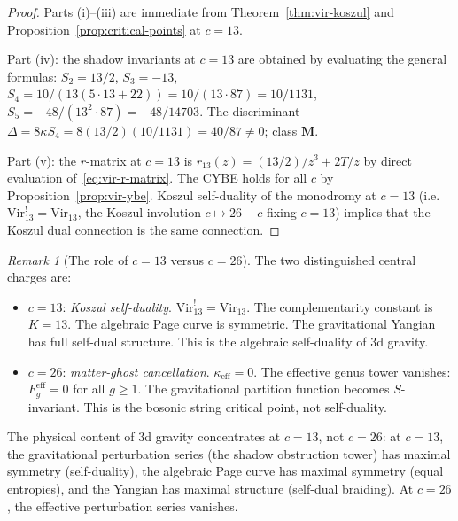 \documentclass[11pt,reqno]{amsart}
\theoremstyle{definition}
\theoremstyle{remark}
\newtheorem{remark}[theorem]{Remark}
\begin{document}
\begin{proof}
Parts (i)--(iii) are immediate from Theorem~\ref{thm:vir-koszul}
and Proposition~\ref{prop:critical-points} at $c = 13$.

Part (iv): the shadow invariants at $c = 13$ are obtained by
evaluating the general formulas: $S_2 = 13/2$,
$S_3 = -13$, $S_4 = 10/(13(5 \cdot 13 + 22))
= 10/(13 \cdot 87) = 10/1131$,
$S_5 = -48/(13^2 \cdot 87) = -48/14703$.
The discriminant $\Delta = 8\kappa S_4
= 8(13/2)(10/1131) = 40/87 \ne 0$; class $\mathbf{M}$.

Part (v): the $r$-matrix at $c = 13$ is
$r_{13}(z) = (13/2)/z^3 + 2T/z$ by direct evaluation
of~\eqref{eq:vir-r-matrix}. The CYBE holds for all $c$ by
Proposition~\ref{prop:vir-ybe}. Koszul self-duality of the
monodromy at $c = 13$ (i.e.\ $\mathrm{Vir}_{13}^!
= \mathrm{Vir}_{13}$, the Koszul involution $c \mapsto 26 - c$
fixing $c = 13$) implies that the Koszul dual connection is the
same connection.
\end{proof}

\begin{remark}[The role of $c = 13$ versus $c = 26$]
\label{rem:c13-vs-c26}
The two distinguished central charges are:
\begin{itemize}
\item $c = 13$: \emph{Koszul self-duality}.
  $\mathrm{Vir}_{13}^! = \mathrm{Vir}_{13}$. The
  complementarity constant is $K = 13$. The algebraic Page curve
  is symmetric. The gravitational Yangian has full self-dual structure.
  This is the algebraic self-duality of $3$d gravity.
\item $c = 26$: \emph{matter-ghost cancellation}.
  $\kappa_{\mathrm{eff}} = 0$. The effective genus tower vanishes:
  $F_g^{\mathrm{eff}} = 0$ for all $g \ge 1$. The gravitational
  partition function becomes $S$-invariant. This is the bosonic
  string critical point, not self-duality.
\end{itemize}
The physical content of $3$d gravity concentrates at $c = 13$, not
$c = 26$: at $c = 13$, the gravitational perturbation series
(the shadow obstruction tower) has maximal symmetry (self-duality),
the algebraic Page curve has maximal symmetry (equal entropies),
and the Yangian has maximal structure (self-dual braiding).
At $c = 26$,
the effective perturbation series vanishes.
\end{remark}
\end{document}
